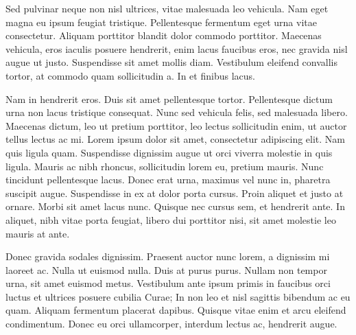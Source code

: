 Sed pulvinar neque non nisl ultrices, vitae malesuada leo vehicula. Nam eget magna eu ipsum feugiat tristique. Pellentesque fermentum eget urna vitae consectetur. Aliquam porttitor blandit dolor commodo porttitor. Maecenas vehicula, eros iaculis posuere hendrerit, enim lacus faucibus eros, nec gravida nisl augue ut justo. Suspendisse sit amet mollis diam. Vestibulum eleifend convallis tortor, at commodo quam sollicitudin a. In et finibus lacus.

Nam in hendrerit eros. Duis sit amet pellentesque tortor. Pellentesque dictum urna non lacus tristique consequat. Nunc sed vehicula felis, sed malesuada libero. Maecenas dictum, leo ut pretium porttitor, leo lectus sollicitudin enim, ut auctor tellus lectus ac mi. Lorem ipsum dolor sit amet, consectetur adipiscing elit. Nam quis ligula quam. Suspendisse dignissim augue ut orci viverra molestie in quis ligula. Mauris ac nibh rhoncus, sollicitudin lorem eu, pretium mauris. Nunc tincidunt pellentesque lacus. Donec erat urna, maximus vel nunc in, pharetra suscipit augue. Suspendisse in ex at dolor porta cursus. Proin aliquet et justo at ornare. Morbi sit amet lacus nunc. Quisque nec cursus sem, et hendrerit ante. In aliquet, nibh vitae porta feugiat, libero dui porttitor nisi, sit amet molestie leo mauris at ante.

Donec gravida sodales dignissim. Praesent auctor nunc lorem, a dignissim mi laoreet ac. Nulla ut euismod nulla. Duis at purus purus. Nullam non tempor urna, sit amet euismod metus. Vestibulum ante ipsum primis in faucibus orci luctus et ultrices posuere cubilia Curae; In non leo et nisl sagittis bibendum ac eu quam. Aliquam fermentum placerat dapibus. Quisque vitae enim et arcu eleifend condimentum. Donec eu orci ullamcorper, interdum lectus ac, hendrerit augue.